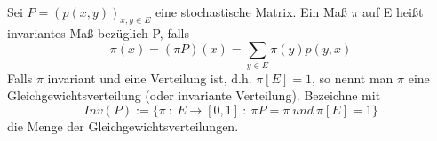 Sei $P = (p(x,y))_{x,y \in E}$ eine stochastische Matrix. Ein Maß $\pi$ auf E heißt invariantes Maß bezüglich P, falls
\begin{equation*}
\pi (x) = (\pi P)(x) = \sum_{y \in E} \pi (y) p(y,x)
\end{equation*}
Falls $\pi$ invariant und eine Verteilung ist, d.h. $\pi[E] = 1$, so nennt man $\pi$ eine Gleichgewichtsverteilung (oder invariante Verteilung). Bezeichne mit
\begin{equation*}
Inv(P) := \lbrace \pi \: : \: E \to [0,1] \: : \: \pi P = \pi \: und \: \pi[E] = 1 \rbrace
\end{equation*}
die Menge der Gleichgewichtsverteilungen.